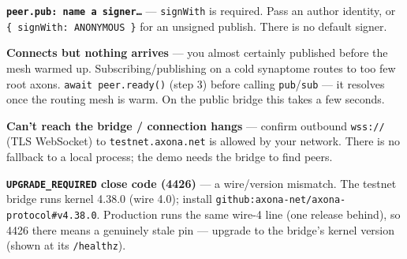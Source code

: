 \documentclass[
  nobib]{tufte-handout}
\begin{document}
\textbf{\texttt{peer.pub:\ name\ a\ signer…}} --- \texttt{signWith} is
required. Pass an author identity, or
\texttt{\{\ signWith:\ ANONYMOUS\ \}} for an unsigned publish. There is
no default signer.

\textbf{Connects but nothing arrives} --- you almost certainly published
before the mesh warmed up. Subscribing/publishing on a cold synaptome
routes to too few root axons. \texttt{await\ peer.ready()} (step 3)
before calling \texttt{pub}/\texttt{sub} --- it resolves once the
routing mesh is warm. On the public bridge this takes a few seconds.

\textbf{Can't reach the bridge / connection hangs} --- confirm outbound
\texttt{wss://} (TLS WebSocket) to \texttt{testnet.axona.net} is allowed
by your network. There is no fallback to a local process; the demo needs
the bridge to find peers.

\textbf{\texttt{UPGRADE\_REQUIRED} close code (4426)} --- a wire/version
mismatch. The testnet bridge runs kernel 4.38.0 (wire 4.0); install
\texttt{github:axona-net/axona-protocol\#v4.38.0}. Production runs the
same wire-4 line (one release behind), so 4426 there means a genuinely
stale pin --- upgrade to the bridge's kernel version (shown at its
\texttt{/healthz}).
\end{document}
